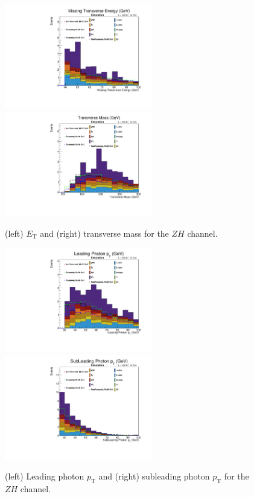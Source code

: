 \documentclass[11pt]{article}
\newcommand{\ET}{\ensuremath{E_{\mathrm{T}}}\xspace}
\newcommand{\pt}{\ensuremath{p_\mathrm{T}}\xspace}
\begin{document}
\begin{figure}[htbp]
\centering
\includegraphics[height=1.8in]{figs/plots_zh/MET.pdf}
\includegraphics[height=1.8in]{figs/plots_zh/MT.pdf}
\caption{(left) \ET and (right) transverse mass for the $ZH$ channel.}
\label{fig:MET}
\end{figure}


\begin{figure}[htbp]
\centering
\includegraphics[height=1.8in]{figs/plots_zh/leadingPhoton_pt.pdf}
\includegraphics[height=1.8in]{figs/plots_zh/subleadingPhoton_pt.pdf}
\caption{(left) Leading photon \pt and (right) subleading photon \pt for the $ZH$ channel.}
\label{fig:leadingPhoton_pt}
\end{figure}
\end{document}
